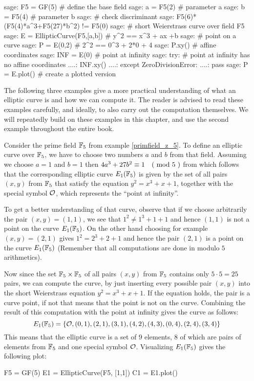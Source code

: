 \begin{sagecommandline}
sage: F5 = GF(5) # define the base field
sage: a = F5(2) # parameter a
sage: b = F5(4) # parameter b
sage: # check discriminant
sage: F5(6)*(F5(4)*a^3+F5(27)*b^2) != F5(0)
sage: # short Weierstrass curve over field F5
sage: E = EllipticCurve(F5,[a,b]) # y^2 == x^3 + ax +b 
sage: # point on a curve
sage: P = E(0,2) # 2^2 == 0^3 + 2*0 + 4
sage: P.xy() # affine coordinates
sage: INF = E(0) # point at infinity
sage: try: 	# point at infinity has no affine coordinates
....:     INF.xy()
....: except ZeroDivisionError:
....:     pass
sage: P = E.plot() # create a plotted version 
\end{sagecommandline}
The following three examples give a more practical understanding of what an elliptic curve is and how we can compute it. The reader is advised to read these examples carefully, and ideally, to also carry out the computation themselves. We will repeatedly build on these examples in this chapter, and use the second example throughout the entire book.
\begin{example}\label{E1F5} Consider the prime field $\mathbb{F}_5$ from example \ref{primfield_z_5}. To define an elliptic curve over $\mathbb{F}_5$, we have to choose two numbers $a$ and $b$ from that field. Assuming we choose $a=1$ and $b=1$ then $4a^3+ 27b^2 \equiv 1 \quad \text{( mod } 5 \text{ )}$ from which follows that the corresponding elliptic curve $E_1(\mathbb{F}_5)$ is given by the set of all pairs $(x,y)$ from $\mathbb{F}_5$ that satisfy the equation $y^2=x^3+x+1$, together with the special symbol $\mathcal{O}$, which represents the ``point at infinity''. 

To get a better understanding of that curve, observe that if we choose arbitrarily the pair $(x,y)=(1,1)$, we see that $1^2 \neq 1^3+1 + 1$ and hence $(1,1)$ is not a point on the curve $E_1(\mathbb{F}_5)$. On the other hand choosing for example $(x,y)=(2,1)$ gives $1^2 = 2^3 + 2 + 1$ and hence the pair $(2,1)$ is a point on the curve $E_1(\mathbb{F}_5)$ (Remember that all computations are done in modulo $5$ arithmetics).

Now since the set $\mathbb{F}_5\times \mathbb{F}_5$ of all pairs $(x,y)$ from $\mathbb{F}_5$ contains only $5\cdot 5=25$ pairs, we can compute the curve, by just inserting every possible pair $(x,y)$ into the short Weierstrass equation $y^2 = x^3 + x +1$. If the equation holds, the pair is a curve point, if not that means that the point is not on the curve. Combining the result of this computation with the point at infinity gives the curve as follows:
$$
E_1(\mathbb{F}_5) = \{\mathcal{O}, (0,1),(2,1),(3,1),(4,2),(4,3),(0,4),(2,4),(3,4)\}
$$
This means that the elliptic curve is a set of $9$ elements, $8$ of which are pairs of elements from $\mathbb{F}_5$ and one special symbol $\mathcal{O}$. Visualizing $E_1(\mathbb{F}_5)$ gives the following plot:
\begin{sagesilent}
F5 = GF(5)
E1 = EllipticCurve(F5, [1,1])
C1 = E1.plot()
\end{sagesilent}
\begin{center} 
\end{center}
\end{example}

